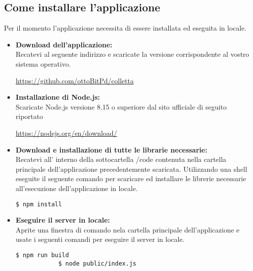 \subsection{Come installare l'applicazione}
Per il momento l'applicazione necessita di essere installata ed eseguita in locale.
\begin{itemize}
	\item \textbf{Download dell'applicazione:}\\
Recatevi al seguente indirizzo e scaricate la versione corrispondente al vostro sistema operativo.
\begin{center}
	\url{https://github.com/ottoBitPd/colletta} 	
\end{center}


	\item \textbf{Installazione di Node.js:}\\
Scaricate Node.js versione 8.15 o superiore dal sito ufficiale di seguito riportato 
\begin{center}
	\url{https://nodejs.org/en/download/}
\end{center}

	\item \textbf{Download e installazione di tutte le librarie necessarie:}\\ 
Recatevi all' interno della sottocartella /code contenuta nella cartella principale dell'applicazione precedentemente scaricata. Utilizzando una shell eseguite il seguente comando per scaricare ed installare le librerie necessarie all'esecuzione dell'applicazione in locale.

\begin{center}
	\begin{minipage}{0.5\textwidth}
		\begin{lstlisting}[caption=Installazione per l'analisi statica,numbers=none]
			$ npm install
		\end{lstlisting}
	\end{minipage}
\end{center}

	\item \textbf{Eseguire il server in locale:}\\
Aprite una finestra di comando nela cartella principale dell'applicazione e usate i seguenti comandi per eseguire il server in locale.

\begin{center}
	\begin{minipage}{0.5\textwidth}
		\begin{lstlisting}[caption=Avvio della piattaforma,numbers=none]	
			$ npm run build
			$ node public/index.js
		\end{lstlisting}
	\end{minipage}
\end{center}

\end{itemize}
